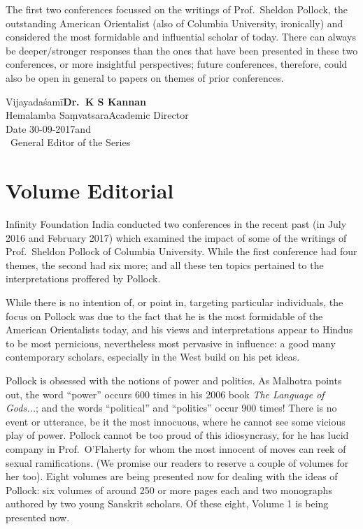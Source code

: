 The first two conferences focussed on the writings of Prof.\ Sheldon Pollock, the outstanding American Orientalist (also of Columbia University, ironically) and considered the most formidable and influential scholar of today. There can always be deeper/stronger responses than the ones that have been presented in these two conferences, or more insightful perspectives; future conferences, therefore, could also be open in general to papers on themes of prior conferences.
\bigskip

\noindent
Vijayadaśamī\hfill	{\bf Dr.~K S Kannan}\\
Hemalamba Saṃvatsara\hfill Academic Director\\
Date 30-09-2017\hfill and\\	
\phantom{.}~\hfill General Editor of the Series                  
               

\chapter*{Volume Editorial}\label{editorial}

\vskip 9pt




Infinity Foundation India conducted two conferences in the recent past (in July 2016 and February 2017) which examined the impact of some of the writings of Prof.\ Sheldon Pollock of Columbia University. While the first conference had four themes, the second had six more; and all these ten topics pertained to the interpretations proffered by Pollock.
\vskip 1.5pt

While there is no intention of, or point in, targeting particular individuals, the focus on Pollock was due to the fact that he is the most formidable of the American Orientalists today, and his views and interpretations appear to Hindus to be most pernicious, nevertheless most pervasive in influence: a good many contemporary scholars, especially in the West  build on his pet ideas. 
\vskip 1.5pt

Pollock is obsessed with the notions of power and politics. As Malhotra points out, the word “power” occurs 600 times in his 2006 book {\sl The Language of Gods...}; and the words “political” and “politics” occur 900 times! There is no event or utterance, be it the most innocuous, where he cannot see some vicious play of power. Pollock cannot be too proud of this idiosyncrasy, for he has lucid company in Prof.\ O’Flaherty for whom the most innocent of moves can reek of sexual ramifications. (We promise our readers to reserve a couple of volumes for her too). Eight volumes are being presented now for dealing with the ideas of Pollock: six volumes of around 250 or more pages each and two monographs authored by two young Sanskrit scholars. Of these eight,  Volume 1 is being presented now.
\vskip 1.5pt

